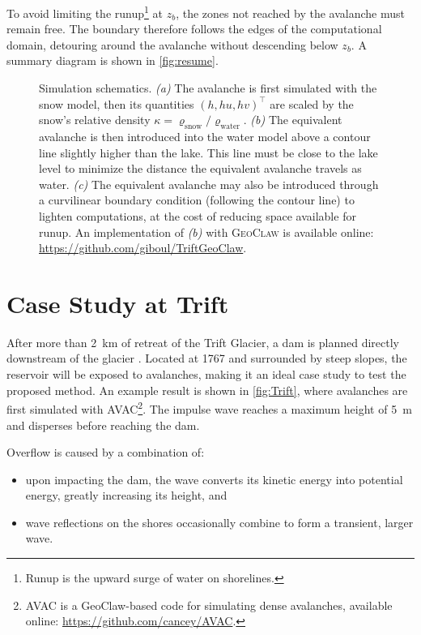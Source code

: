 \documentclass[11pt]{article}
\begin{document}
To avoid limiting the runup\footnote{Runup is the upward surge of water on shorelines.} at $z_b$, the zones not reached by the avalanche must remain free.
The boundary therefore follows the edges of the computational domain, detouring around the avalanche without descending below $z_b$. A summary diagram is shown in \autoref{fig:resume}.

\begin{figure}
    \centering
    
    \caption{Simulation schematics.
    \textit{(a)} The avalanche is first simulated with the snow model, then its quantities $(h, hu, hv)^\intercal$ are scaled by the snow's relative density $\kappa=\varrho_\text{snow}/\varrho_\text{water}$.
    \textit{(b)} The equivalent avalanche is then introduced into the water model above a contour line slightly higher than the lake.
    This line must be close to the lake level to minimize the distance the equivalent avalanche travels as water.
    \textit{(c)} The equivalent avalanche may also be introduced through a curvilinear boundary condition (following the contour line) to lighten computations, at the cost of reducing space available for runup.
    An implementation of \textit{(b)} with \textsc{GeoClaw} is available online: \href{https://github.com/giboul/TriftGeoClaw}{https://github.com/giboul/TriftGeoClaw}.}
    \label{fig:resume}
\end{figure}

\section{Case Study at Trift}

After more than \SI{2}{\kilo\meter} of retreat of the Trift Glacier,
a dam is planned directly downstream of the glacier \citep{manso}.
Located at \SI{1767}{\msm} and surrounded by steep slopes, the reservoir will be exposed to avalanches,
making it an ideal case study to test the proposed method.
An example result is shown in \autoref{fig:Trift}, where avalanches are first simulated with AVAC\footnote{
    AVAC is a GeoClaw-based code for simulating dense avalanches, available online:
    \href{https://github.com/cancey/AVAC}{https://github.com/cancey/AVAC}.
}.
The impulse wave reaches a maximum height of \SI{5}{\meter} and disperses before reaching the dam.

Overflow is caused by a combination of:
\begin{itemize}
    \item upon impacting the dam, the wave converts its kinetic energy into potential energy, greatly increasing its height, and
    \item wave reflections on the shores occasionally combine to form a transient, larger wave.
\end{itemize}
\end{document}
